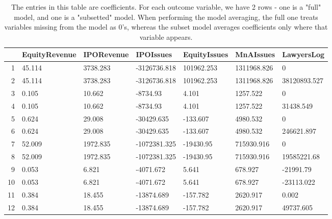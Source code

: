 \begin{table}[ht]
\centering
\begin{tabular}{rllllll}
  \hline
 & EquityRevenue & IPORevenue & IPOIssues & EquityIssues & MnAIssues & LawyersLog \\ 
  \hline
1 & 45.114 & 3738.283 & -3126736.818 & 101962.253 & 1311968.826 & 0 \\ 
  2 & 45.114 & 3738.283 & -3126736.818 & 101962.253 & 1311968.826 & 38120893.527 \\ 
  3 & 0.105 & 10.662 & -8734.93 & 4.101 & 1257.522 & 0 \\ 
  4 & 0.105 & 10.662 & -8734.93 & 4.101 & 1257.522 & 31438.549 \\ 
  5 & 0.624 & 29.008 & -30429.635 & -133.607 & 4980.532 & 0 \\ 
  6 & 0.624 & 29.008 & -30429.635 & -133.607 & 4980.532 & 246621.897 \\ 
  7 & 52.009 & 1972.835 & -1072381.325 & -19430.95 & 715930.916 & 0 \\ 
  8 & 52.009 & 1972.835 & -1072381.325 & -19430.95 & 715930.916 & 19585221.68 \\ 
  9 & 0.053 & 6.821 & -4071.672 & 5.641 & 678.927 & -21991.79 \\ 
  10 & 0.053 & 6.821 & -4071.672 & 5.641 & 678.927 & -23113.022 \\ 
  11 & 0.384 & 18.455 & -13874.689 & -157.782 & 2620.917 & 0.002 \\ 
  12 & 0.384 & 18.455 & -13874.689 & -157.782 & 2620.917 & 49737.605 \\ 
   \hline
\end{tabular}
\caption{The entries in this table are coefficients. For each outcome variable, 
                  we have 2 rows - one is a "full" model, and one is a "subsetted" model.
                  When performing the model averaging, the full one treats variables missing from the model as 0's,
                  whereas the subset model averages coefficients only where that variable appears.} 
\end{table}
